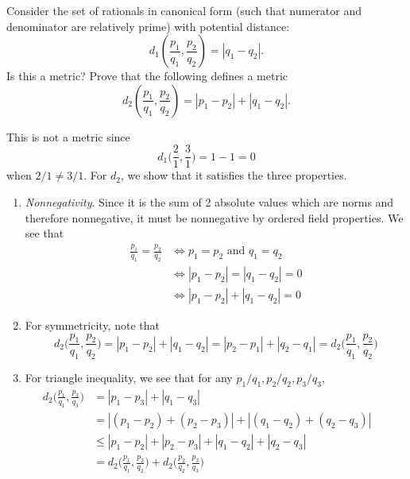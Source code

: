   \begin{exercise}
    Consider the set of rationals in canonical form (such that numerator and denominator are relatively prime) with potential distance:
    \begin{equation}
      d_1(\frac{p_1}{q_1}, \frac{p_2}{q_2}) = |q_1 - q_2|.
    \end{equation}
    Is this a metric? Prove that the following defines a metric
    \begin{equation}
      d_2(\frac{p_1}{q_1}, \frac{p_2}{q_2}) = |p_1 - p_2| + |q_1 - q_2|.
    \end{equation}
  \end{exercise} 
  \begin{solution}
    This is not a metric since 
    \begin{equation}
      d_1 \bigg( \frac{2}{1}, \frac{3}{1} \bigg) = 1 - 1 = 0
    \end{equation} 
    when $2/1 \neq 3/1$. For $d_2$, we show that it satisfies the three properties. 
    \begin{enumerate}
      \item \textit{Nonnegativity}. Since it is the sum of 2 absolute values which are norms and therefore nonnegative, it must be nonnegative by ordered field properties. We see that 
      \begin{align}
        \frac{p_1}{q_1} = \frac{p_2}{q_2} & \iff p_1 = p_2 \text{ and } q_1 = q_2 \\
                                          & \iff |p_1 - p_2| = |q_1 - q_2| = 0 \\
                                          & \iff |p_1 - p_2| + |q_1 - q_2| = 0 
      \end{align}

      \item For symmetricity, note that 
        \begin{equation}
          d_2 \bigg( \frac{p_1}{q_1} , \frac{p_2}{q_2} \bigg) = |p_1 - p_2| + |q_1 - q_2| = |p_2 - p_1| + |q_2 - q_1| = d_2 \bigg( \frac{p_1}{q_1} , \frac{p_2}{q_2} \bigg)
        \end{equation}

        \item For triangle inequality, we see that for any $p_1/q_1, p_2/q_2, p_3/q_3$, 
        \begin{align}
          d_2 \bigg( \frac{p_1}{q_1}, \frac{p_3}{q_3} \bigg) & = |p_1 - p_3| + |q_1 - q_3| \\
                                                             & = |(p_1 - p_2) + (p_2 - p_3)| + |(q_1 - q_2) + (q_2 - q_3)| \\
                                                             & \leq |p_1 - p_2| + |p_2 - p_3| + |q_1 - q_2| + |q_2 - q_3| && \tag{subadditivity of norm} \\
                                                             & = d_2 \bigg( \frac{p_1}{q_1}, \frac{p_2}{q_2} \bigg) + d_2 \bigg( \frac{p_2}{q_2}, \frac{p_3}{q_3} \bigg) 
        \end{align}
    \end{enumerate}
  \end{solution}

